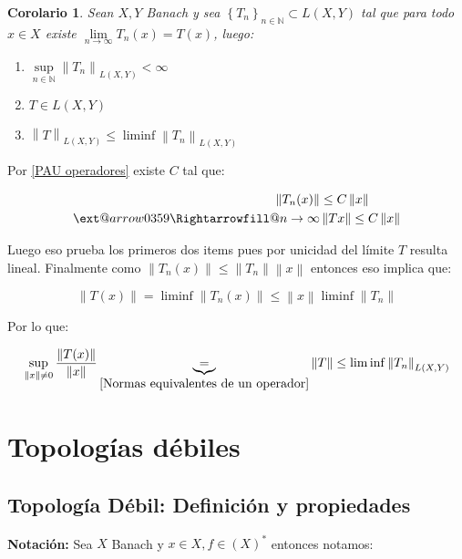 \documentclass[11pt]{article}
\makeatletter
\newcommand{\N}{{\mathbb{N}}}
\newcommand{\dual}[1]{\left(#1\right)^{\ast}}
\newcommand{\norm}[1]{\left\lVert#1\right\rVert}
\newcommand{\sett}[1]{\left\lbrace#1\right\rbrace}
\numberwithin{theorem}{subsection}
\newtheorem{corollary}[theorem]{Corolario}
\newenvironment{proof}[1][Demostraci\'on]{\begin{trivlist}
		\item[\hskip \labelsep {\bfseries #1}]}{\end{trivlist}}
\newcommand{\qed}{\nobreak \ifvmode \relax \else
	\ifdim\lastskip<1.5em \hskip-\lastskip
	\hskip1.5em plus0em minus0.5em \fi \nobreak
	\vrule height0.75em width0.5em depth0.25em\fi}
\newcommand{\xRightarrow}[2][]{\ext@arrow 0359\Rightarrowfill@{#1}{#2}}
\makeatother
\begin{document}
\begin{corollary}
	\label{Sucesion de operadores que convergen puntualmente definen un operador limite puntual}
	Sean $X,Y$ Banach y sea $\sett{T_n}_{n \in \N} \subset L(X,Y)$ tal que para todo $x \in X$ existe $\lim\limits_{n \rightarrow \infty} T_n(x) = T(x)$, luego:
	
	\begin{enumerate}
		\item $\sup\limits_{n \in \N}{\norm{T_n}_{L(X,Y)}} < \infty$
		\item $T \in L(X,Y)$
		\item $\norm{T}_{L(X,Y)} \leq \liminf \norm{T_n}_{L(X,Y)}$
	\end{enumerate}
	
\end{corollary}

\begin{proof}
	Por \ref{PAU operadores} existe $C$ tal que:
	
	\[
	\begin{aligned}
		\norm{T_n(x)} & \leq C \norm{x} \\
		\xRightarrow{n \rightarrow \infty} & \norm{Tx} \leq C \norm{x} 
	\end{aligned}
	\]
	
	Luego eso prueba los primeros dos items pues por unicidad del l\'imite $T$ resulta lineal. Finalmente como $\norm{T_n(x)} \leq \norm{T_n}\norm{x}$ entonces eso implica que:
	
	$$\norm{T(x)} = \liminf \norm{T_n(x)} \leq \norm{x} \liminf \norm{T_n}$$
	
	Por lo que:
	
	$$\sup\limits_{\norm{x} \neq 0}{\dfrac{\norm{T(x)}}{\norm{x}}} \underbrace{=}_{\ref{Normas equivalentes de un operador}} \norm{T} \leq \liminf \norm{T_n}_{L(X,Y)}$$ \qed
	
\end{proof}


\section{Topolog\'ias d\'ebiles}

\subsection{Topolog\'ia D\'ebil: Definici\'on y propiedades}

\textbf{Notaci\'on:} Sea $X$ Banach y $x \in X, f \in \dual{X}$ entonces notamos:
\end{document}
